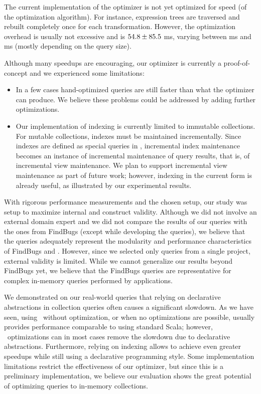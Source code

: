 The current implementation of the optimizer is not yet optimized for speed (of the optimization algorithm). For instance, expression trees are traversed and rebuilt completely once for each transformation.
However, the optimization overhead is usually not excessive and 
is $54.8 \pm 85.5$ ms, varying between \minOptimTime{} ms and \maxOptimTime{} ms (mostly depending on the query size).

Although many speedups are encouraging, our optimizer is currently a proof-of-concept and we experienced some limitations:
\begin{itemize}
\item In a few cases hand-optimized queries are still faster than what the optimizer can produce. We believe these problems could be addressed by adding further optimizations.
\item Our implementation of indexing is currently limited to immutable collections. For mutable collections, indexes must be maintained incrementally. 
Since indexes are defined as special queries in {\LoS},  incremental index maintenance becomes an instance of incremental maintenance of query results, that is, of incremental view maintenance. We plan to support incremental view maintenance as part of future work; however,
indexing in the current form is already useful, as illustrated by our experimental results.
\end{itemize}

With rigorous performance measurements and the chosen setup, our study was setup to maximize internal and construct validity. Although we did not involve an external domain expert and we did not compare the results of our queries with the ones from FindBugs (except while developing the queries), we believe that the queries adequately represent the modularity and performance characteristics of FindBugs and {\LoS}. However, since we selected only queries from a single project, external validity is limited. 
While we cannot generalize our results beyond FindBugs yet, we believe that the FindBugs queries are representative for complex in-memory queries performed by applications.


We demonstrated on our real-world queries that relying on declarative abstractions in collection queries often causes a significant slowdown. As we have seen, using \LoS\ without optimization, or when no optimizations are possible, usually provides performance comparable to using standard Scala; however, \LoS\ optimizations can in most cases remove the slowdown due to declarative abstractions. Furthermore, relying on indexing allows to achieve even greater speedups while still using a declarative programming style.
Some implementation limitations restrict the effectiveness of our optimizer, but since this is a preliminary implementation, we believe our evaluation shows the great potential of optimizing queries to in-memory collections.


